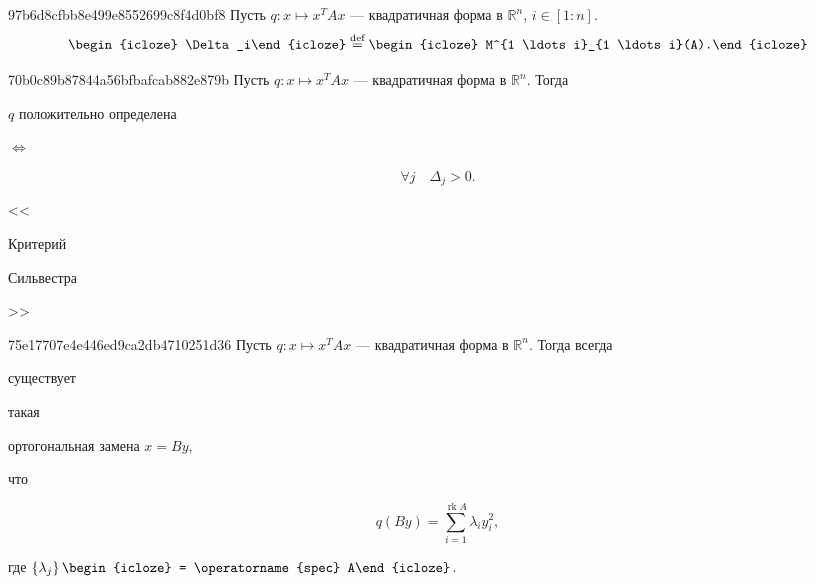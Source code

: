 \begin{note}{97b6d8cfbb8e499e8552699c8f4d0bf8}
    Пусть \({ q : x \mapsto x^{T}Ax }\) --- квадратичная форма в \({ \mathbb R^{n} }\),\: \({ i \in [1 : n] }\).
    \[
        \begin{icloze}{2}\Delta_i\end{icloze} \overset{\text{def}}= \begin{icloze}{1}M^{1 \ldots i}_{1 \ldots i}(A).\end{icloze}
    \]
\end{note}

\begin{note}{70b0c89b87844a56bfbafcab882e879b}
    Пусть \({ q : x \mapsto x^{T}Ax }\) --- квадратичная форма в \({ \mathbb R^{n} }\).
    Тогда \begin{icloze}{2}\({ q }\) положительно определена\end{icloze} \begin{icloze}{3}\({ \iff }\)\end{icloze}
    \begin{icloze}{1}
        \[
            \forall j \quad \Delta_j > 0.
        \]
    \end{icloze}

    \begin{center}
        \tiny <<\begin{icloze}{3}Критерий\end{icloze} \begin{icloze}{4}Сильвестра\end{icloze}>>
    \end{center}
\end{note}

\begin{note}{75e17707e4e446ed9ca2db4710251d36}
    Пусть \({ q : x \mapsto x^{T}Ax }\) --- квадратичная форма в \({ \mathbb R^{n} }\).
    Тогда всегда \begin{icloze}{4}существует\end{icloze} такая \begin{icloze}{3}ортогональная замена \({ x = By }\),\end{icloze} что
    \begin{icloze}{1}
        \[
            q(By) = \sum_{i=1}^{\operatorname{rk} A} \lambda_i y_i^2,
        \]
    \end{icloze}
    где \({ \left\{ \lambda_j \right\} \begin{icloze}{2}= \operatorname{spec} A\end{icloze} }\).
\end{note}

